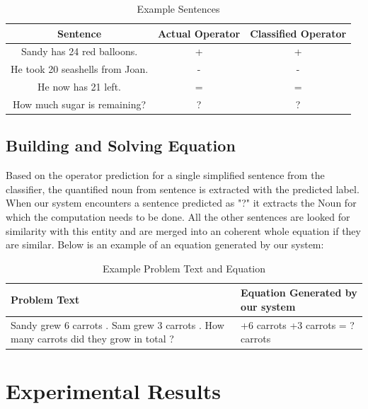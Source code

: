 \documentclass[11pt]{article}
\begin{document}
\begin{table}[h]
\begin{center}
\begin{tabular}{|c|c|c|}
\hline
\bf Sentence & \bf Actual Operator & \bf Classified Operator\\
\hline
Sandy has 24 red balloons. & + & +\\
\hline
He took 20 seashells from Joan. & - & -\\
\hline
He now has 21 left. & = & =\\
\hline
How much sugar is remaining? & ? & ?\\
\hline
\end{tabular}
\end{center}
\caption{\label{prediction-example-table} Example Sentences}
\end{table}


\subsection{Building and Solving Equation}

Based on the operator prediction for a single simplified sentence from the classifier, the quantified noun from sentence is extracted with the predicted label. When our system encounters a sentence predicted as "?" it extracts the Noun for which the computation needs to be done. All the other sentences are looked for similarity with this entity and are merged into an coherent whole equation if they are similar. Below is an example of an equation generated by our system:

\begin{table}[h]
\begin{center}
\begin{tabular}{|>{\centering\arraybackslash}m{8cm}|>{\centering\arraybackslash}m{6cm}|}
\hline
\bf Problem Text & \bf Equation Generated by our system\\
\hline
Sandy grew 6 carrots . Sam grew 3 carrots . How many carrots did they grow in total ? & +6 carrots +3 carrots = ? carrots\\
\hline
\end{tabular}
\end{center}
\caption{\label{equation-example-table} Example Problem Text and Equation}
\end{table}

\section{Experimental Results}
\end{document}
